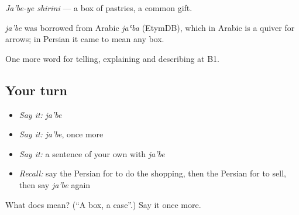 \emph{Ja'be-ye shirini} — a box of pastries, a common gift.

\begin{cousinweb}
\emph{ja'be} was borrowed from Arabic \emph{jaʿba} (EtymDB), which in Arabic is a quiver for arrows; in Persian it came to mean any box.
\end{cousinweb}

\begin{grammarlens}[title={What you've built}]
One more word for telling, explaining and describing at B1.
\end{grammarlens}

\subsection*{Your turn}
\begin{itemize}
\raggedright
  \item \emph{Say it:} \emph{ja'be}
  \item \emph{Say it:} \emph{ja'be}, once more
  \item \emph{Say it:} a sentence of your own with \emph{ja'be}
  \item \emph{Recall:} say the Persian for to do the shopping, then the Persian for to sell, then say \emph{ja'be} again
\end{itemize}

\begin{tcolorbox}[breakable,colback=teal!4,colframe=teal!35!black,title={Before you move on}]
What does  mean? (\textquotedblleft{}A box, a case\textquotedblright{}.) Say it once more.
\end{tcolorbox}
